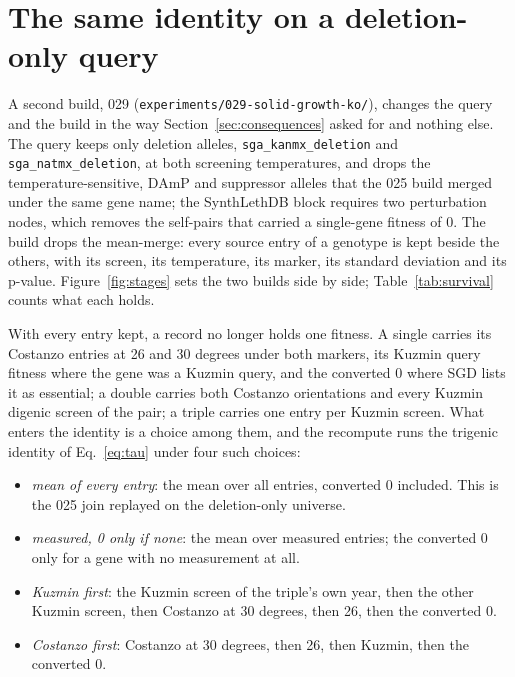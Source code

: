 
\section{The same identity on a deletion-only query}
\label{sec:deletion-query}

A second build, 029 (\texttt{experiments/029-solid-growth-ko/}), changes the query and
the build in the way Section~\ref{sec:consequences} asked for and nothing else. The
query keeps only deletion alleles, \texttt{sga\_kanmx\_deletion} and
\texttt{sga\_natmx\_deletion}, at both screening temperatures, and drops the
temperature-sensitive, DAmP and suppressor alleles that the 025 build merged under the
same gene name; the SynthLethDB block requires two perturbation nodes, which removes
the self-pairs that carried a single-gene fitness of 0. The build drops the mean-merge:
every source entry of a genotype is kept beside the others, with its screen, its
temperature, its marker, its standard deviation and its p-value. Figure~\ref{fig:stages}
sets the two builds side by side; Table~\ref{tab:survival} counts what each holds.


With every entry kept, a record no longer holds one fitness. A single carries its
Costanzo entries at 26 and 30 degrees under both markers, its Kuzmin query fitness
where the gene was a Kuzmin query, and the converted 0 where SGD lists it as
essential; a double carries both Costanzo orientations and every Kuzmin digenic
screen of the pair; a triple carries one entry per Kuzmin screen. What enters the
identity is a choice among them, and the recompute runs the trigenic identity of
Eq.~\ref{eq:tau} under four such choices:

\begin{itemize}
\item \emph{mean of every entry}: the mean over all entries, converted 0 included.
  This is the 025 join replayed on the deletion-only universe.
\item \emph{measured, 0 only if none}: the mean over measured entries; the converted
  0 only for a gene with no measurement at all.
\item \emph{Kuzmin first}: the Kuzmin screen of the triple's own year, then the other
  Kuzmin screen, then Costanzo at 30 degrees, then 26, then the converted 0.
\item \emph{Costanzo first}: Costanzo at 30 degrees, then 26, then Kuzmin, then the
  converted 0.
\end{itemize}


